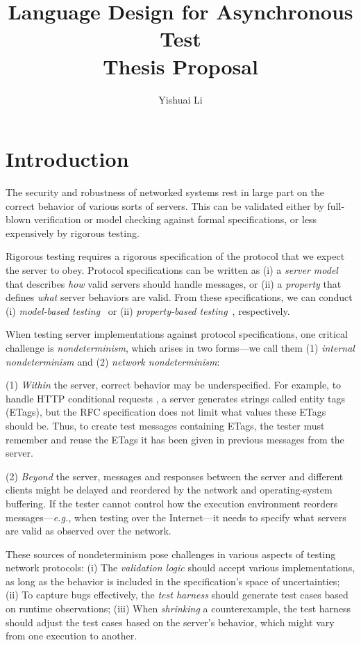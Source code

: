 \documentclass{article}
\title{Language Design for Asynchronous Test\\
  \large \medskip Thesis Proposal}
\author{Yishuai Li}
\theoremstyle{definition}
\begin{document}
\maketitle
\section{Introduction}
\label{sec:intro}

The security and robustness of networked systems rest in large part on the
correct behavior of various sorts of servers.  This can be validated either by
full-blown verification or model checking against formal specifications, or
less expensively by rigorous testing.

Rigorous testing requires a rigorous specification of the protocol that we
expect the server to obey.  Protocol specifications can be written as (i) a {\em
  server model} that describes {\em how} valid servers should handle messages,
or (ii) a {\em property} that defines {\em what} server behaviors are valid.
From these specifications, we can conduct (i) {\em model-based
  testing}~\cite{broy2005model} or (ii) {\em property-based testing}~\cite{pbt},
respectively.

When testing server implementations against protocol specifications, one
critical challenge is {\em nondeterminism}, which arises in two forms---we call
them (1) {\em internal nondeterminism} and (2) {\em network nondeterminism}:

(1) {\em Within} the server, correct behavior may be \mbox{underspecified}.
For example, to handle HTTP conditional requests \cite{rfc7232}, a server
generates strings called entity tags (ETags), but the RFC specification does
not limit {what} values these ETags should be.  Thus, to create test
messages containing ETags, the tester must remember and reuse the ETags it
has been given in previous messages from the server.

(2) {\em Beyond} the server, messages and responses between the server and
different clients might be delayed and reordered by the network and
operating-system buffering.  If the tester cannot control how the execution
environment reorders messages---{\it e.g.,} when testing over the Internet---it
needs to specify what servers are valid as observed over the network.

These sources of nondeterminism pose challenges in various aspects of testing network
protocols: (i) The {\em validation logic} should accept various implementations,
as long as the behavior is included in the specification's space of
uncertainties; (ii) To capture bugs effectively, the {\em test harness} should
generate test cases based on runtime observations; (iii) When {\em shrinking} a
counterexample, the test harness should adjust the test cases based on the
server's behavior, which might vary from one execution to another.
\end{document}
